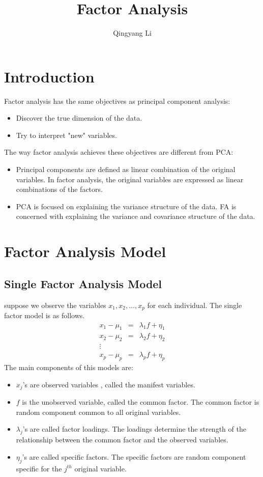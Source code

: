 \documentclass{article}
\title{Factor Analysis}
\author{Qingyang Li}
\date{}
\begin{document}
\maketitle

\section{Introduction}
Factor analysis has the same objectives as principal component analysis:
\begin{itemize}
    \item Discover the true dimension of the data.
    \item Try to interpret "new" variables.
\end{itemize}
The way factor analysis achieves these objectives are different from PCA:
\begin{itemize}
    \item Principal components are defined as linear combination of the original variables. In factor analysis, the original variables are expressed as linear combinations of the factors.
    \item PCA is focused on explaining the variance structure of the data. FA is concerned with explaining the variance and covariance structure of the data.
\end{itemize}

\section{Factor Analysis Model}

\subsection{Single Factor Analysis Model}
suppose we observe the variables $x_1,x_2,\hdots,x_p$ for each individual. The single factor model is as follows.
\begin{eqnarray*}
x_1-\mu_1 &=& \lambda_1f+\eta_1\\
x_2-\mu_2 &=& \lambda_2f+\eta_2\\
\vdots\\
x_p-\mu_p &=& \lambda_pf+\eta_p
\end{eqnarray*}
The main components of this models are:
\begin{itemize}
    \item $x_j$'s are observed variables , called the manifest variables.
    \item $f$ is the unobserved variable, called the common factor. The common factor is random component common to all original variables.
    \item $\lambda_j$'s are called factor loadings. The loadings determine the strength of the relationship between the common factor and the observed variables.
    \item $\eta_j$'s are called specific factors. The specific factors are random component specific for the $j^{th}$ original variable.
\end{itemize}
\end{document}
